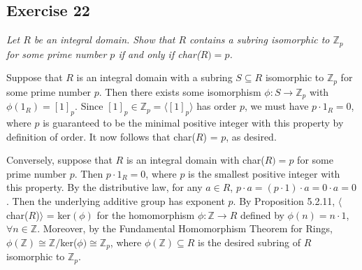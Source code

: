 \subsection*{Exercise 22}
\textit{Let $R$ be an integral domain. Show that $R$ contains a subring isomorphic to $\mathbb{Z}_p$ for some prime number $p$ if and only if char($R) = p$.}

\vspace{5 mm}
Suppose that $R$ is an integral domain with a subring $S \subseteq R$ isomorphic to $\mathbb{Z}_p$ for some prime number $p$. Then there exists some isomorphism $\phi: S \rightarrow \mathbb{Z}_p$ with $\phi(1_R) = [1]_p$. Since $[1]_p \in \mathbb{Z}_p = \langle [1]_p \rangle$ has order $p$, we must have $p \cdot 1_R = 0$, where $p$ is guaranteed to be the minimal positive integer with this property by definition of order. It now follows that char($R$) = $p$, as desired.

Conversely, suppose that $R$ is an integral domain with char($R) = p$ for some prime number $p$. Then $p \cdot 1_R = 0$, where $p$ is the smallest positive integer with this property. By the distributive law, for any $a \in R$, $p\cdot a = (p \cdot 1)\cdot a = 0 \cdot a = 0$. Then the underlying additive group has exponent $p$. By Proposition 5.2.11, $\langle$char($R$)$\rangle$ = ker$(\phi)$ for the homomorphism $\phi: \mathbb{Z} \rightarrow R$ defined by $\phi(n) = n \cdot 1$, $\forall n \in \mathbb{Z}$. Moreover, by the Fundamental Homomorphism Theorem for Rings, $\phi(\mathbb{Z}) \cong \mathbb{Z} /$ker($\phi) \cong \mathbb{Z}_p$, where $\phi(\mathbb{Z}) \subseteq R$ is the desired subring of $R$ isomorphic to $\mathbb{Z}_p$.